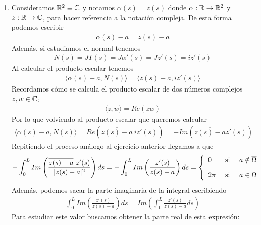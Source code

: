 \begin{observacion}
\begin{enumerate}[start=4]
        \item Consideramos $\mathbb{R}^2 \equiv \mathbb{C}$ y notamos $\alpha(s)=z(s)$ donde $\alpha:\mathbb{R}\to \mathbb{R}^2$ y $z:\mathbb{R} \to \mathbb{C}$, para hacer referencia a la notación compleja. De esta forma podemos escribir
        \begin{gather*}
            \alpha(s) - a = z(s)-a
        \end{gather*}
        Además, si estudiamos el normal tenemos
        \begin{gather*}
            N(s) = JT(s) = J\alpha'(s) = Jz'(s) = iz'(s)
        \end{gather*}
        Al calcular el producto escalar tenemos 
        \begin{gather*}
            \langle \alpha(s) - a, N(s) \rangle = \langle z(s)-a, iz'(s) \rangle
        \end{gather*}
        Recordamos cómo se calcula el producto escalar de dos números complejos $z,w\in \mathbb{C}$:
        \begin{gather*}
            \langle z, w \rangle = Re(\overline{z}w)
        \end{gather*}
        Por lo que volviendo al producto escalar que queremos calcular
        \begin{gather*}
            \langle \alpha(s) - a, N(s) \rangle = Re(\overline{z(s)-a}\ iz'(s)) = -Im(\overline{z(s)-a} z'(s))
        \end{gather*}
        Repitiendo el proceso análogo al ejercicio anterior llegamos a que 
        \begin{gather*}
            - \int_0^L Im \left(\frac{\overline{z(s)-a}\ z'(s)}{|z(s)-a|^2}\right) ds = - \int_0^L Im \left(\frac{z'(s)}{z(s)-a}\right) ds= 
            \left\{
                \begin{array}{l c c}
                    0 & \text{ si } & a\notin \overline{\Omega}\\[1em]
                    2\pi & \text{ si } & a\in \Omega
                \end{array}
            \right.
        \end{gather*}
        Además, podemos sacar la parte imaginaria de la integral escribiendo
        \begin{gather*}
            \int_0^L Im \left(\frac{z'(s)}{z(s)-a}\right) ds = Im \left( \int_0^L \frac{z'(s)}{z(s)-a}ds\right)
        \end{gather*}
        Para estudiar este valor buscamos obtener la parte real de esta expresión:
        \begin{align*}

\end{align*}
\end{enumerate}
\end{observacion}
